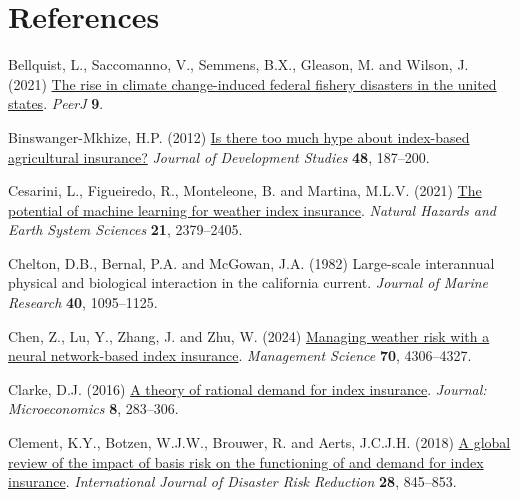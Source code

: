 \documentclass[
  letterpaper,
  DIV=11,
  numbers=noendperiod]{scrartcl}
\newlength{\cslhangindent}
\newlength{\cslentryspacingunit} %
\newenvironment{CSLReferences}[2] %
 {%
  \setlength{\parindent}{0pt}
  \ifodd #1
  \let\oldpar\par
  \def\par{\hangindent=\cslhangindent\oldpar}
  \fi
  \setlength{\parskip}{#2\cslentryspacingunit}
 }%
 {}
\begin{document}
\hypertarget{references}{%
\section*{References}\label{references}}

\hypertarget{refs}{}
\begin{CSLReferences}{1}{0}
\leavevmode{}%
Bellquist, L., Saccomanno, V., Semmens, B.X., Gleason, M. and Wilson, J.
(2021) \href{https://doi.org/10.7717/peerj.11186}{The rise in climate
change-induced federal fishery disasters in the united states}.
\emph{PeerJ} \textbf{9}.

\leavevmode{}%
Binswanger-Mkhize, H.P. (2012)
\href{https://doi.org/10.1080/00220388.2011.625411}{Is there too much
hype about index-based agricultural insurance?} \emph{Journal of
Development Studies} \textbf{48}, 187--200.

\leavevmode{}%
Cesarini, L., Figueiredo, R., Monteleone, B. and Martina, M.L.V. (2021)
\href{https://doi.org/10.5194/nhess-21-2379-2021}{The potential of
machine learning for weather index insurance}. \emph{Natural Hazards and
Earth System Sciences} \textbf{21}, 2379--2405.

\leavevmode{}%
Chelton, D.B., Bernal, P.A. and McGowan, J.A. (1982) Large-scale
interannual physical and biological interaction in the california
current. \emph{Journal of Marine Research} \textbf{40}, 1095--1125.

\leavevmode{}%
Chen, Z., Lu, Y., Zhang, J. and Zhu, W. (2024)
\href{https://doi.org/10.1287/mnsc.2023.4902}{Managing weather risk with
a neural network-based index insurance}. \emph{Management Science}
\textbf{70}, 4306--4327.

\leavevmode{}%
Clarke, D.J. (2016) \href{https://doi.org/10.1257/mic.20140103}{A theory
of rational demand for index insurance}. \emph{Journal: Microeconomics}
\textbf{8}, 283--306.

\leavevmode{}%
Clement, K.Y., Botzen, W.J.W., Brouwer, R. and Aerts, J.C.J.H. (2018)
\href{https://doi.org/10.1016/j.ijdrr.2018.01.001}{A global review of
the impact of basis risk on the functioning of and demand for index
insurance}. \emph{International Journal of Disaster Risk Reduction}
\textbf{28}, 845--853.


\end{CSLReferences}
\end{document}
